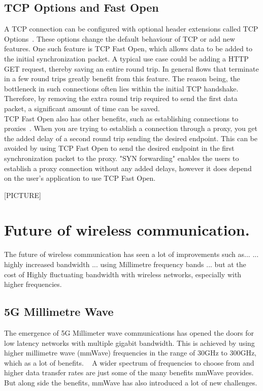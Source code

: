 \documentclass[a4paper,english, 11pt]{report}
\begin{document}
\subsection{TCP Options and Fast Open}
A TCP connection can be configured with optional header extensions called TCP Options~\cite{tcp_options}. These options change the default behaviour of TCP or add new features. One such feature is TCP Fast Open, which allows data to be added to the initial synchronization packet. A typical use case could be adding a HTTP GET request, thereby saving an entire round trip. In general flows that terminate in a few round trips greatly benefit from this feature. The reason being, the bottleneck in such connections often lies within the initial TCP handshake. Therefore, by removing the extra round trip required to send the first data packet, a significant amount of time can be saved.\\

TCP Fast Open also has other benefits, such as establishing connections to proxies~\cite{rfc8803}. When you are trying to establish a connection through a proxy, you get the added delay of a second round trip sending the desired endpoint. This can be avoided by using TCP Fast Open to send the desired endpoint in the first synchronization packet to the proxy. "SYN forwarding" enables the users to establish a proxy connection without any added delays, however it does depend on the user's application to use TCP Fast Open.

[PICTURE]

\section{Future of wireless communication.}
The future of wireless communication has seen a lot of improvements such as...
... highly increased bandwidth ... using Millimetre frequency bands ... but at the cost of Highly fluctuating bandwidth with wireless networks, especially with higher frequencies.\\ 

\subsection{5G Millimetre Wave}
The emergence of 5G Millimeter wave communications has opened the doors for low latency networks with multiple gigabit bandwidth. This is achieved by using higher millimetre wave (mmWave) frequencies in the range of 30GHz to 300GHz, which as a lot of benefits. ~\cite{Agrawal_Sharma_2016} A wider spectrum of frequencies to choose from and higher data transfer rates are just some of the many benefits mmWave provides. But along side the benefits, mmWave has also introduced a lot of new challenges.\\
\end{document}

